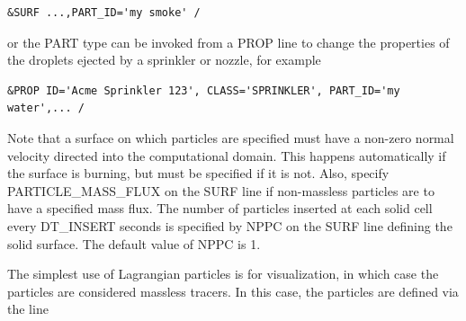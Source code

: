 \documentclass[11pt]{book}
\begin{document}
\footnotesize
\begin{verbatim}
&SURF ...,PART_ID='my smoke' /
\end{verbatim}
\normalsize
or the {\ct PART} type can be invoked from a {\ct PROP} line to change
the properties of the droplets ejected by a sprinkler or nozzle, for example

\footnotesize
\begin{verbatim}
&PROP ID='Acme Sprinkler 123', CLASS='SPRINKLER', PART_ID='my water',... /
\end{verbatim}
\normalsize
Note that a surface on which particles are specified must have a non-zero normal velocity directed into the
computational domain. This happens automatically if the surface is burning, but must be specified
if it is not. Also, specify {\ct PARTICLE\_MASS\_FLUX} on the {\ct SURF} line if non-massless particles
are to have a specified mass flux. The number of particles inserted at each solid cell every
{\ct DT\_INSERT} seconds is specified by {\ct NPPC} on the {\ct SURF} line defining the solid surface. The default
value of {\ct NPPC} is 1.

The simplest use of Lagrangian particles is for visualization, in which case the
particles are considered massless tracers. In this case, the particles are
defined via the line
\end{document}
